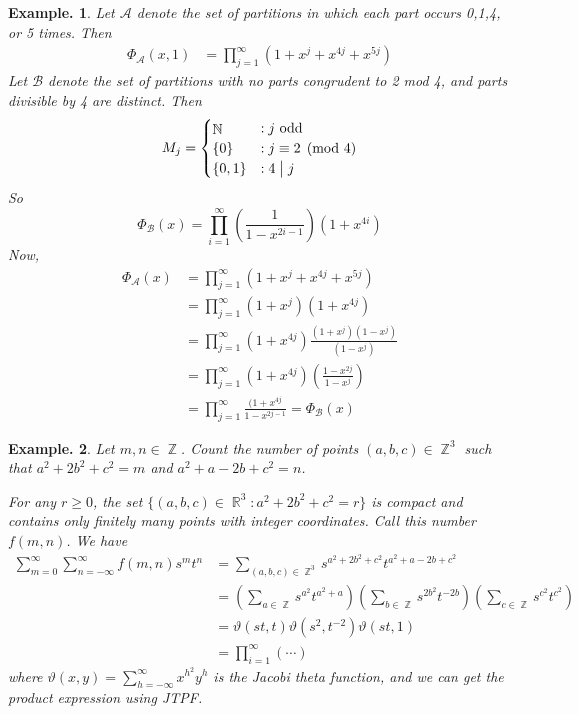 \documentclass[11pt, a4paper]{memoir}
\DeclareMathOperator{\N}{{\mathbb{N}}}
\DeclareMathOperator{\Z}{{\mathbb{Z}}}
\DeclareMathOperator{\R}{{\mathbb{R}}}
\renewcommand{\div}{\bigm|}
\theoremstyle{change}
\theoremstyle{plain}
\theoremstyle{nonumberplain}
\newtheorem{example}{Example.}
\numberwithin{equation}{section}
\begin{document}
\begin{example}
    Let $\mathcal{A}$ denote the set of partitions in which each part occurs 0,1,4, or 5 times.
    Then
    \begin{align*}
        \Phi_{\mathcal{A}}(x,1) &= \prod_{j=1}^\infty(1+x^j+x^{4j}+x^{5j})
    \end{align*}
    Let $\mathcal{B}$ denote the set of partitions with no parts congrudent to 2 mod 4, and parts divisible by 4 are distinct.
    Then
    \begin{equation*}
        M_j = 
        \begin{cases}
            \N &:j\text{ odd}\\
            \{0\} &: j\equiv 2\pmod{4}\\
            \{0,1\} & : 4\div j
        \end{cases}
    \end{equation*}
    So
    \begin{equation*}
        \Phi_{\mathcal{B}}(x)=\prod_{i=1}^\infty\left(\frac{1}{1-x^{2i-1}}\right)(1+x^{4i})
    \end{equation*}
    Now,
    \begin{align*}
        \Phi_{\mathcal{A}}(x) &= \prod_{j=1}^\infty(1+x^j+x^{4j}+x^{5j})\\
                              &= \prod_{j=1}^\infty(1+x^j)(1+x^{4j})\\
                              &= \prod_{j=1}^\infty(1+x^{4j})\frac{(1+x^j)(1-x^j)}{(1-x^j)}\\
                              &= \prod_{j=1}^\infty(1+x^{4j})\left(\frac{1-x^{2j}}{1-x^j}\right)\\
                              &= \prod_{j=1}^\infty\frac{(1+x^{4j}}{1-x^{2j-1}}=\Phi_{\mathcal{B}}(x)
    \end{align*}
\end{example}
\begin{example}
    Let $m,n\in\Z$.
    Count the  number of points $(a,b,c)\in\Z^3$ such that $a^2+2b^2+c^2=m$ and $a^2+a-2b+c^2=n$.
    
    For any $r\geq 0$, the set $\{(a,b,c)\in\R^3:a^2+2b^2+c^2=r\}$ is compact and contains only finitely many points with integer coordinates.
    Call this number $f(m,n)$.
    We have
    \begin{align*}
        \sum_{m=0}^\infty\sum_{n=-\infty}^\infty f(m,n)s^mt^n &= \sum_{(a,b,c)\in\Z^3}s^{a^2+2b^2+c^2}t^{a^2+a-2b+c^2}\\
                                                              &= \left(\sum_{a\in\Z} s^{a^2}t^{a^2+a}\right)\left(\sum_{b\in\Z}s^{2b^2}t^{-2b}\right)\left(\sum_{c\in\Z}s^{c^2}t^{c^2}\right)\\
                                                              &= \vartheta(st,t)\vartheta(s^2,t^{-2})\vartheta(st,1)\\
                                                              &= \prod_{i=1}^\infty(\cdots)
    \end{align*}
    where $\vartheta(x,y)=\sum_{h=-\infty}^\infty x^{h^2}y^h$ is the Jacobi theta function, and we can get the product expression using JTPF.
\end{example}
\end{document}
